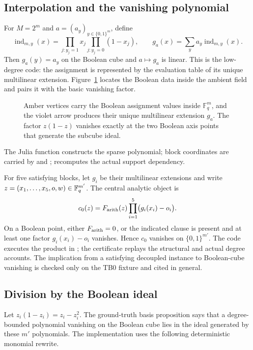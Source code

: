 \subsection{Interpolation and the vanishing polynomial}

For \(M=2^m\) and \(a=(a_y)_{y\in\{0,1\}^m}\), define
\[
 \operatorname{ind}_{m,y}(x)=
 \prod_{j:y_j=1}x_j\prod_{j:y_j=0}(1-x_j),\qquad
 g_a(x)=\sum_y a_y\operatorname{ind}_{m,y}(x).
\]
Then \(g_a(y)=a_y\) on the Boolean cube and \(a\mapsto g_a\) is linear.
This is the low-degree code: the assignment is represented by the evaluation
table of its unique multilinear extension.
Figure~\ref{fig:interpolation-subcube} locates the Boolean data inside the
ambient field and pairs it with the basic vanishing factor.
\begin{figure}[t]
\centering

\caption{Amber vertices carry the Boolean assignment values inside \(\mathbb F_q^m\), and the violet arrow produces their unique multilinear extension \(g_a\).  The factor \(z(1-z)\) vanishes exactly at the two Boolean axis points that generate the subcube ideal.}
\label{fig:interpolation-subcube}
\end{figure}
The Julia function  constructs the sparse polynomial; block
coordinates are carried by  and ;
 recomputes the actual support dependency.

For five satisfying blocks, let \(g_i\) be their multilinear extensions and
write \(z=(x_1,\ldots,x_5,o,w)\in\mathbb F_q^{m'}\).  The central analytic object is
\[
 c_0(z)=F_{\rm arith}(z)
        \prod_{i=1}^{5}\bigl(g_i(x_i)-o_i\bigr).
\]
On a Boolean point, either \(F_{\rm arith}=0\), or the indicated clause is
present and at least one factor \(g_i(x_i)-o_i\) vanishes.  Hence \(c_0\)
vanishes on \(\{0,1\}^{m'}\).  The code executes the product in
; the  certificate replays the structural and
actual degree accounts.  The implication from a satisfying decoupled instance
to Boolean-cube vanishing is checked only on the TB0 fixture and cited in
general.

\subsection{Division by the Boolean ideal}

Let \(z_i(1-z_i)=z_i-z_i^2\).  The ground-truth basis proposition says that a
degree-bounded polynomial vanishing on the Boolean cube lies in the ideal
generated by these \(m'\) polynomials.
The implementation uses the following deterministic monomial rewrite.

